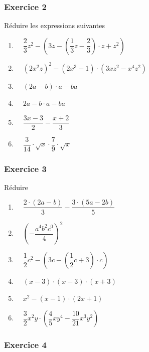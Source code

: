 \documentclass[
  12pt,
]{book}
\providecommand{\tightlist}{%
  \setlength{\itemsep}{0pt}\setlength{\parskip}{0pt}}
\begin{document}
\hypertarget{exercice-2-4}{%
\subsubsection*{Exercice 2}\label{exercice-2-4}}

Réduire les expressions suivantes

\begin{enumerate}
\def\labelenumi{\arabic{enumi}.}
\tightlist
\item
  \(\quad \dfrac{2}{3}z^2-(3z-(\dfrac{1}{3}z-\dfrac{2}{3})\cdot z+ z^2)\)
\item
  \(\quad (2x^2z)^2-(2x^3-1)\cdot(3xz^2-x^4z^2)\)
\item
  \(\quad (2a-b)\cdot a-ba\)
\item
  \(\quad 2a-b\cdot a - ba\)
\item
  \(\quad \dfrac{3x-3}{2}-\dfrac{x+2}{3}\)
\item
  \(\quad \dfrac{3}{14}\cdot\sqrt{x}\cdot\dfrac{7}{9}\cdot\sqrt{x}\)
\end{enumerate}

\hypertarget{exercice-3-5}{%
\subsubsection*{Exercice 3}\label{exercice-3-5}}

Réduire

\begin{enumerate}
\def\labelenumi{\arabic{enumi}.}
\tightlist
\item
  \(\quad\dfrac{2\cdot(2a-b)}{3}-\dfrac{3\cdot(5a-2b)}{5}\)
\item
  \(\quad\left(-\dfrac{a^4b^2c^0}{4}\right)^2\)
\item
  \(\quad \dfrac{1}{2}c^2-(3c-(\dfrac{1}{2}c+3)\cdot c)\)
\item
  \(\quad (x-3)\cdot(x-3)\cdot(x+3)\)
\item
  \(\quad x^2-(x-1)\cdot(2x+1)\)
\item
  \(\quad \dfrac{3}{2}x^2y\cdot\left(\dfrac{4}{5}xy^4-\dfrac{10}{21}x^3y^2\right)\)
\end{enumerate}

\hypertarget{exercice-4-5}{%
\subsubsection*{Exercice 4}\label{exercice-4-5}}
\end{document}
